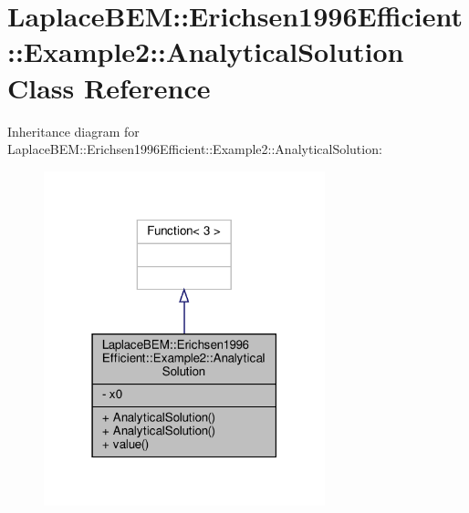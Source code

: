 \hypertarget{classLaplaceBEM_1_1Erichsen1996Efficient_1_1Example2_1_1AnalyticalSolution}{}\section{Laplace\+B\+EM\+:\+:Erichsen1996\+Efficient\+:\+:Example2\+:\+:Analytical\+Solution Class Reference}
\label{classLaplaceBEM_1_1Erichsen1996Efficient_1_1Example2_1_1AnalyticalSolution}


Inheritance diagram for Laplace\+B\+EM\+:\+:Erichsen1996\+Efficient\+:\+:Example2\+:\+:Analytical\+Solution\+:\nopagebreak
\begin{figure}[H]
\begin{center}
\leavevmode
\includegraphics[width=231pt]{classLaplaceBEM_1_1Erichsen1996Efficient_1_1Example2_1_1AnalyticalSolution__inherit__graph}
\end{center}
\end{figure}


